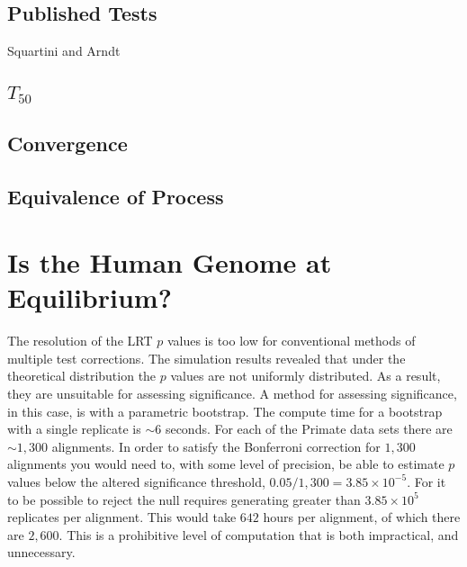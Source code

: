 \subsection{Published Tests}
Squartini and Arndt 


% 

\subsection{$T_{50}$}

% 

% 

\subsection{Convergence}

% 

\subsection{Equivalence of Process}

\section{Is the Human Genome at Equilibrium?}




The resolution of the LRT $p$ values is too low for conventional methods of multiple test corrections. The simulation results revealed that under the theoretical distribution the $p$ values are not uniformly distributed. As a result, they are unsuitable for assessing significance. A method for assessing significance, in this case, is with a parametric bootstrap. The compute time for a bootstrap with a single replicate is ${\sim} 6$ seconds. For each of the Primate data sets there are ${\sim} 1,300$ alignments. In order to satisfy the Bonferroni correction for $1,300$ alignments you would need to, with some level of precision, be able to estimate $p$ values below the altered significance threshold, $0.05/1,300 = 3.85{\times}10^{-5}$. For it to be possible to reject the null requires generating greater than $3.85{\times}10^{5}$ replicates per alignment. This would take $642$ hours per alignment, of which there are $2,600$. This is a prohibitive level of computation that is both impractical, and unnecessary. 

